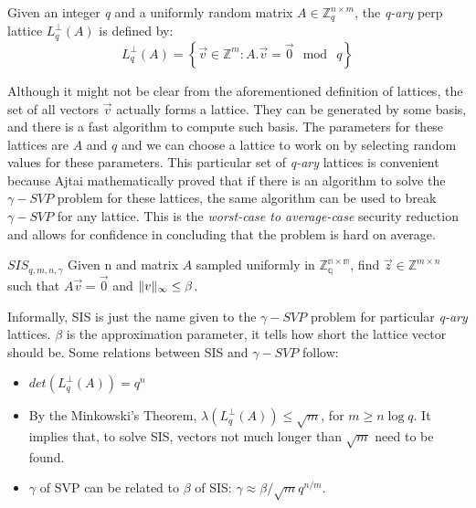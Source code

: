 \begin{definition}
  Given an integer \emph{q} and a uniformly random matrix
  $A \in \mathbb{Z}_{q}^{n \times m}$, the \emph{q-ary} perp lattice
  $L_q^\bot(A)$ is defined by:
  \[
    L_q^\bot(A) = \left\{ \vec{v} \in \mathbb{Z}^m : A.\vec{v} = \vec{0} \mod \
      q \right\}
  \]
\end{definition}
Although it might not be clear from the aforementioned definition of lattices, the set of all vectors
$\vec{v}$ actually forms a lattice. They can be generated by some basis, and
there is a fast algorithm to compute such basis. The parameters for these
lattices are $A$ and $q$ and we can choose a lattice to work on by selecting random
values for these parameters. This particular set of \emph{q-ary} lattices is convenient
because Ajtai mathematically proved that if there is an algorithm to solve the
$\gamma-SVP$ problem for these lattices, the same algorithm can be used to break
$\gamma-SVP$ for any lattice. This is the \emph{worst-case to average-case}
security reduction and allows for confidence in concluding that the problem is hard on average.
\begin{definition}
  $SIS_{q,m,n,\gamma}$ Given n and matrix $A$ sampled uniformly in
  $\mathbb{Z_q^{n \times m}}$, find $\vec{z} \in \mathbb{Z}^{m \times n}$ such
  that $A\vec{v} = \vec{0}$ and $\Vert v \Vert_{\infty} \leq \beta$.
  \label{def:SISProblem}
\end{definition}
Informally, SIS is just the name given to the $\gamma-SVP$ problem for
particular \emph{q-ary} lattices. $\beta$ is the approximation parameter, it
tells how short the lattice vector should be. Some relations between SIS and
$\gamma-SVP$ follow:
\begin{itemize}
\item $det(L_q^\bot(A)) = q^n$
\item By the Minkowski's Theorem, $\lambda(L_q^\bot(A)) \leq \sqrt{m}$, for
  $m \geq n \log q$. It implies that, to solve SIS, vectors not much longer
  than $\sqrt{m}$ need to be found.
\item  $\gamma$ of SVP can be related to $\beta$ of SIS:
  $\gamma \approx \beta/\sqrt{m}q^{n/m}$.
\end{itemize}

